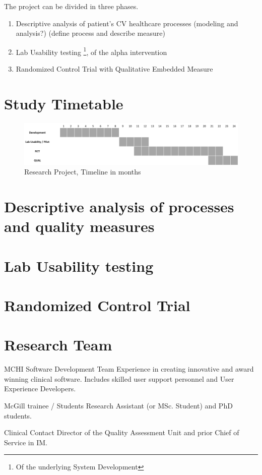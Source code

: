 The project can be divided in three phases.

\begin{enumerate}
    \item Descriptive analysis of patient's CV healthcare processes (modeling and analysis?) (define process and describe measure)
    \item Lab Usability testing \footnote{Of the underlying System Development}, of the alpha intervention
    \item Randomized Control Trial with Qualitative Embedded Measure
\end{enumerate}

\section{Study Timetable}

\begin{figure}[h]
    \centering
    \includegraphics[width=\textwidth]{img/timeline-overall.PNG}
    \caption{Research Project, Timeline in months}
    \label{fig:timeline}
\end{figure}

\section{Descriptive analysis of processes and quality measures}


\section{Lab Usability testing}


\section{Randomized Control Trial}


\section{Research Team}
MCHI Software Development Team
	Experience in creating innovative and award winning clinical software.
	Includes skilled user support personnel and User Experience Developers.

McGill trainee / Students
	Research Assistant (or MSc. Student) and PhD students.

Clinical Contact
	Director of the Quality Assessment Unit and prior Chief of Service in IM.
